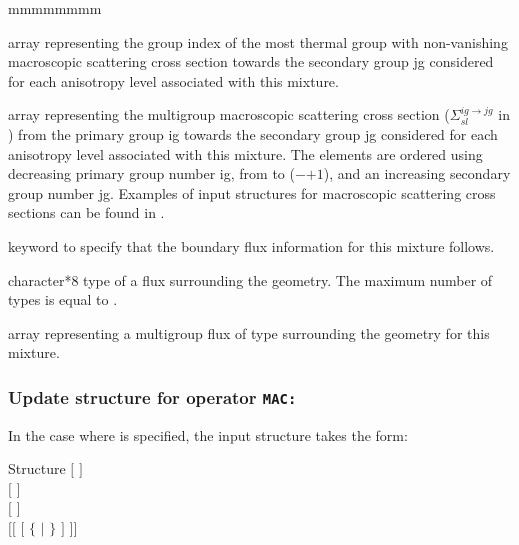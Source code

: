 \begin{ListeDeDescription}{mmmmmmmm}
\item[\dusa{ilastg}] array representing the group index of the most thermal
group with non-vanishing macroscopic scattering cross section towards the
secondary group jg considered for each anisotropy level associated with this
mixture.

\item[\dusa{xsscat}] array representing the multigroup macroscopic scattering
cross section ($\Sigma_{sl}^{ig\to jg}$ in \xsunit) from the primary group ig
towards the secondary group jg considered for each anisotropy level associated
with this mixture. The elements are ordered using decreasing primary group
number ig, from  to ($-$$+1$), and an
increasing secondary group number jg. Examples of input structures for 
macroscopic scattering cross sections can be
found in .

\item[\moc{ADF}] keyword to specify that the boundary flux information for this mixture follows.

\item[\dusa{hadf}] character*8 type of a flux surrounding the geometry. The maximum number of types is equal to .

\item[\dusa{xadf}] array representing a multigroup flux of type  surrounding the geometry for this
mixture. 

\end{ListeDeDescription}

\subsubsection{Update structure for operator {\tt MAC:}}\label{sect:descmacupd}
 
In the case where  is specified, the  input structure takes
the form:

\begin{DataStructure}{Structure }
$[$   $]$ \\
$[$   $]$ \\
$[$   $]$ \\
$[[$   $[$  $\{$  $|$  $\}$ $]$ $]]$ \\
\moc{;}
\end{DataStructure}

